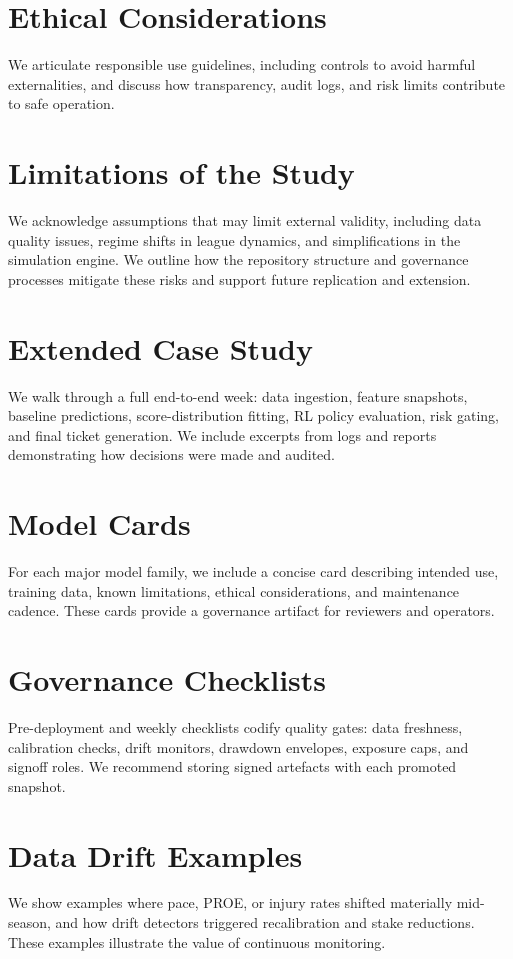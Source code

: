 \documentclass[12pt]{report}  %
\numberwithin{equation}{section}
\theoremstyle{plain}
\theoremstyle{definition}
\theoremstyle{remark}
\begin{document}
\section{Ethical Considerations}
We articulate responsible use guidelines, including controls to avoid harmful externalities, and discuss how transparency, audit logs, and risk limits contribute to safe operation.

\section{Limitations of the Study}
We acknowledge assumptions that may limit external validity, including data quality issues, regime shifts in league dynamics, and simplifications in the simulation engine. We outline how the repository structure and governance processes mitigate these risks and support future replication and extension.

\section{Extended Case Study}
We walk through a full end-to-end week: data ingestion, feature snapshots, baseline predictions, score-distribution fitting, RL policy evaluation, risk gating, and final ticket generation. We include excerpts from logs and reports demonstrating how decisions were made and audited.

\section{Model Cards}
For each major model family, we include a concise card describing intended use, training data, known limitations, ethical considerations, and maintenance cadence. These cards provide a governance artifact for reviewers and operators.

\section{Governance Checklists}
Pre-deployment and weekly checklists codify quality gates: data freshness, calibration checks, drift monitors, drawdown envelopes, exposure caps, and signoff roles. We recommend storing signed artefacts with each promoted snapshot.

\section{Data Drift Examples}
We show examples where pace, PROE, or injury rates shifted materially mid-season, and how drift detectors triggered recalibration and stake reductions. These examples illustrate the value of continuous monitoring.
\end{document}
